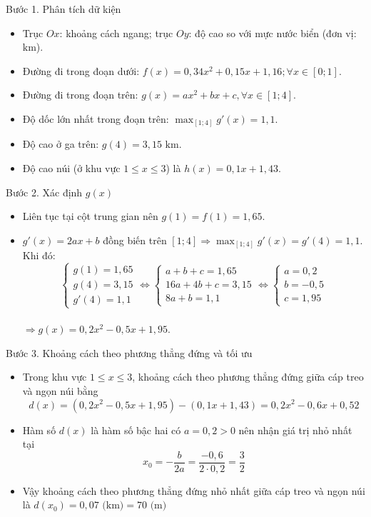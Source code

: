 \documentclass[12pt,a4paper,oneside]{book}
\theoremstyle{theorem}
\theoremstyle{definition}
\begin{document}
            Bước 1. Phân tích dữ kiện
\begin{itemize}
    \item Trục $Ox$: khoảng cách ngang; trục $Oy$: độ cao so với mực nước biển (đơn vị: $\text{km}$).
    \item Đường đi trong đoạn dưới: $f(x) = 0,34x^2 + 0,15x + 1,16; \forall x \in [0; 1]$.
    \item Đường đi trong đoạn trên: $g(x) = ax^2 + bx + c, \forall x \in [1; 4]$.
    \item Độ dốc lớn nhất trong đoạn trên: $\max_{[1; 4]} g'(x) = 1,1$.
    \item Độ cao ở ga trên: $g(4) = 3,15 \text{ km}$.
    \item Độ cao núi (ở khu vực $1 \le x \le 3$) là $h(x) = 0,1x + 1,43$.
\end{itemize}

Bước 2. Xác định $g(x)$
\begin{itemize}
    \item Liên tục tại cột trung gian nên $g(1) = f(1) = 1,65$.
    \item $g'(x) = 2ax + b$ đồng biến trên $[1; 4] \Rightarrow \max_{[1; 4]} g'(x) = g'(4) = 1,1$. Khi đó:
    $$\begin{cases} g(1) = 1,65 \\ g(4) = 3,15 \\ g'(4) = 1,1 \end{cases} \Leftrightarrow \begin{cases} a + b + c = 1,65 \\ 16a + 4b + c = 3,15 \\ 8a + b = 1,1 \end{cases} \Leftrightarrow \begin{cases} a = 0,2 \\ b = -0,5 \\ c = 1,95 \end{cases}$$\\
    $\Rightarrow g(x) = 0,2x^2 - 0,5x + 1,95.$
\end{itemize}

Bước 3. Khoảng cách theo phương thẳng đứng và tối ưu
\begin{itemize}
    \item Trong khu vực $1 \le x \le 3$, khoảng cách theo phương thẳng đứng giữa cáp treo và ngọn núi bằng
    $$d(x) = (0,2x^2 - 0,5x + 1,95) - (0,1x + 1,43) = 0,2x^2 - 0,6x + 0,52$$
    \item Hàm số $d(x)$ là hàm số bậc hai có $a = 0,2 > 0$ nên nhận giá trị nhỏ nhất tại
    $$x_0 = -\dfrac{b}{2a} = \dfrac{-0,6}{2 \cdot 0,2} = \dfrac{3}{2}$$
    \item Vậy khoảng cách theo phương thẳng đứng nhỏ nhất giữa cáp treo và ngọn núi là $d(x_0) = 0,07 \text{ (km)} = 70 \text{ (m)}$
\end{itemize}
         
\end{document}
